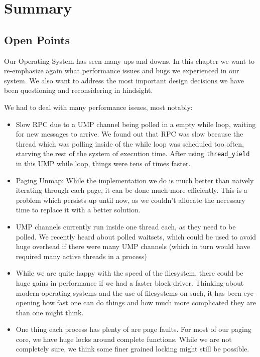\chapter{Summary}

\section{Open Points}
Our Operating System has seen many ups and downs.
In this chapter we want to re-emphasize again what performance issues and bugs we experienced in our system.
We also want to address the most important design decisions we have been questioning and reconsidering in hindsight.

We had to deal with many performance issues, most notably:
\begin{itemize}
\item Slow RPC due to a UMP channel being polled in a empty while loop, waiting for new messages to arrive. We found out that 
RPC was slow because the thread which was polling inside of the while loop was scheduled too often, starving the rest of the system
of execution time. After using \texttt{thread\_yield} in this UMP while loop, things were tens of times faster.
\item Paging Unmap: While the implementation we do is much better than naively iterating through each page, it can be done much more efficiently.
This is a problem which persists up until now, as we couldn't allocate the necessary time to replace it with a better solution.
\item UMP channels currently run inside one thread each, as they need to be polled. We recently heard about polled waitsets, which could be
used to avoid huge overhead if there were many UMP channels (which in turn would have required many active threads in a process)
\item While we are quite happy with the speed of the filesystem, there could be huge gains in performance if we had a faster block driver.
Thinking about modern operating systems and the use of filesystems on such, it has been eye-opening how fast one can do things and how much more 
complicated they are than one might think.
\item One thing each process has plenty of are page faults. For most of our paging core, we have huge locks around complete functions.
While we are not completely sure, we think some finer grained locking might still be possible.
\end{itemize}

